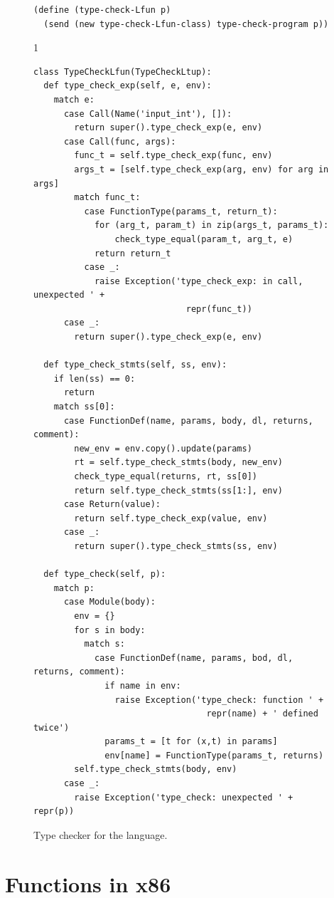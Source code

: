 \documentclass[7x10]{TimesAPriori_MIT}%
\def\pythonEd{1}
\def\edition{1}
\newcommand{\pythonColor}[0]{}
\numberwithin{theorem}{chapter}
\numberwithin{definition}{chapter}
\numberwithin{equation}{chapter}
\begin{document}
\begin{figure}[tp]
\begin{tcolorbox}[colback=white]
{\begin{lstlisting}[basicstyle=\ttfamily\footnotesize]
(define (type-check-Lfun p)
  (send (new type-check-Lfun-class) type-check-program p))
\end{lstlisting}
\fi}
{\if\edition\pythonEd\pythonColor
\begin{lstlisting}  
class TypeCheckLfun(TypeCheckLtup):
  def type_check_exp(self, e, env):
    match e:
      case Call(Name('input_int'), []):
        return super().type_check_exp(e, env)      
      case Call(func, args):
        func_t = self.type_check_exp(func, env)
        args_t = [self.type_check_exp(arg, env) for arg in args]
        match func_t:
          case FunctionType(params_t, return_t):
            for (arg_t, param_t) in zip(args_t, params_t):
                check_type_equal(param_t, arg_t, e)
            return return_t
          case _:
            raise Exception('type_check_exp: in call, unexpected ' +
                              repr(func_t))
      case _:
        return super().type_check_exp(e, env)

  def type_check_stmts(self, ss, env):
    if len(ss) == 0:
      return
    match ss[0]:
      case FunctionDef(name, params, body, dl, returns, comment):
        new_env = env.copy().update(params)
        rt = self.type_check_stmts(body, new_env)
        check_type_equal(returns, rt, ss[0])
        return self.type_check_stmts(ss[1:], env)
      case Return(value):
        return self.type_check_exp(value, env)
      case _:
        return super().type_check_stmts(ss, env)

  def type_check(self, p):
    match p:
      case Module(body):
        env = {}
        for s in body:
          match s:
            case FunctionDef(name, params, bod, dl, returns, comment):
              if name in env:
                raise Exception('type_check: function ' +
                                  repr(name) + ' defined twice')
              params_t = [t for (x,t) in params]
              env[name] = FunctionType(params_t, returns)
        self.type_check_stmts(body, env)
      case _:
        raise Exception('type_check: unexpected ' + repr(p))
\end{lstlisting}
\fi}
  \end{tcolorbox}

  \caption{Type checker for the \LangFun{} language.}
\label{fig:type-check-Lfun}
\end{figure}


\clearpage

\section{Functions in x86}
\label{sec:fun-x86}
\end{document}
